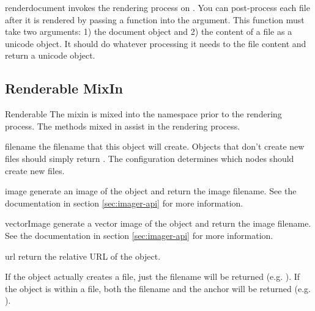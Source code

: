 \begin{methoddesc}[Renderer]{render}{document}
invokes the rendering process on .  You can post-process each
file after it is rendered by passing a function into the 
argument.  This function must take two arguments: 1) the document object and
2) the content of a file as a unicode object.  It should do whatever 
processing it needs to the file content and return a unicode object.
\end{methoddesc}


\subsection{Renderable MixIn}

\begin{classdesc}{Renderable}{}
The  mixin is mixed into the  namespace
prior to the rendering process.  The methods mixed in assist in the 
rendering process.
\end{classdesc}

\begin{memberdesc}[Renderable]{filename}
the filename that this object will create.  Objects that don't create 
new files should simply return .   The configuration determines
which nodes should create new files. 
\end{memberdesc}

\begin{memberdesc}[Renderable]{image}
generate an image of the object and return the image filename.  See
the  documentation in section \ref{sec:imager-api} for
more information.
\end{memberdesc}

\begin{memberdesc}[Renderable]{vectorImage}
generate a vector image of the object and return the image filename.  See
the  documentation in section \ref{sec:imager-api} for
more information.
\end{memberdesc}

\begin{memberdesc}[Renderable]{url}
return the relative URL of the object.  

If the object actually creates a file, just the filename will
be returned (e.g. ).  If the object is within a file, 
both the filename and the anchor will be returned 
(e.g. ).
\end{memberdesc}



